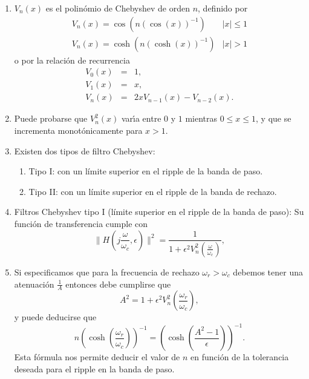 \begin{enumerate}
        \item   $V_{n}(x)$ es el polin\'{o}mio de Chebyshev de orden $n$, definido por
                \begin{equation}
                  \begin{array}{cc} 
                    V_{n}(x) = \cos(n (\cos(x))^{-1}) & |x| \leq 1 \\
                    V_{n}(x) = \cosh(n (\cosh(x))^{-1}) & |x| > 1
                  \end{array}
                \end{equation}
                o por la relaci\'{o}n de recurrencia
                \begin{eqnarray}
                        V_{0}(x)        &=& 1,                          \\
                        V_{1}(x)        &=& x,                          \\
                        V_{n}(x)        &=& 2 x V_{n-1}(x) - V_{n-2}(x).
                \end{eqnarray}

        \item   Puede probarse que $V_{n}^{2}(x)$ var\'{\i}a entre $0$ y $1$ mientras $0 \leq x \leq 1$, y 
          que se incrementa monot\'{o}nicamente para $x > 1$.

        \item   Existen dos tipos de filtro Chebyshev:
          \begin{enumerate}
            \item Tipo I: con un l\'{i}mite superior en el ripple de la banda de paso.
            \item Tipo II: con un l\'{i}mite superior en el ripple de la banda de rechazo.
          \end{enumerate}

        \item  Filtros Chebyshev tipo I (l\'{i}mite superior en el ripple de la banda de paso):
          Su funci\'{o}n de transferencia cumple con
          \begin{equation}
             \parallel H(j \frac{\omega}{\omega_{c}}, \epsilon) \parallel^{2} =
                   \frac{1}{1 + \epsilon^{2} V_{n}^{2}(\frac{\omega}{\omega_{c}})},
          \end{equation}

        \item   Si especificamos que para la frecuencia de rechazo $\omega_{r} > \omega_{c}$
          debemos tener una atenuaci\'{o}n $\frac{1}{A}$ entonces debe cumplirse que
          \begin{equation}
            A^{2} = 1 + \epsilon^{2} V_{n}^{2}(\frac{\omega_{r}}{\omega_{c}}),
          \end{equation}
          y puede deducirse que
          \begin{equation}
            n (\cosh(\frac{\omega_{r}}{\omega_{c}}))^{-1} = (\cosh(\frac{A^{2}-1}{\epsilon}))^{-1}.
          \end{equation}
          Esta f\'{o}rmula nos permite deducir el valor de $n$ en funci\'{o}n de la tolerancia deseada
          para el ripple en la banda de paso.


\end{enumerate}
